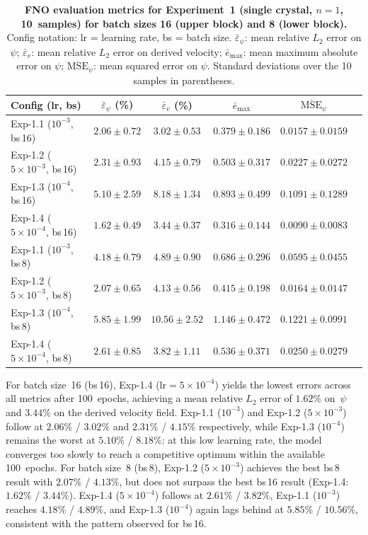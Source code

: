 \begin{table}[htbp]
\centering
\caption{\textbf{FNO evaluation metrics for Experiment~1 (single crystal, $n=1$, 10~samples)
         for batch sizes 16 (upper block) and 8 (lower block).}
         Config notation: lr = learning rate, bs = batch size.
         $\bar{\varepsilon}_\psi$: mean relative $L_2$ error on $\psi$;
         $\bar{\varepsilon}_v$: mean relative $L_2$ error on derived velocity;
         $\bar{e}_{\max}$: mean maximum absolute error on $\psi$;
         $\overline{\text{MSE}}_\psi$: mean squared error on $\psi$.
         Standard deviations over the 10 samples in parentheses.}
\label{tab:fno_metrics_exp1}
\begin{tabular}{lccccc}
\toprule
\textbf{Config (lr, bs)} & $\bar{\varepsilon}_\psi$ (\%) & $\bar{\varepsilon}_v$ (\%) & $\bar{e}_{\max}$ & $\overline{\text{MSE}}_\psi$ \\
\midrule
Exp-1.1 ($10^{-3}$, bs\,16)
    & $2.06 \pm 0.72$ & $3.02 \pm 0.53$ & $0.379 \pm 0.186$ & $0.0157 \pm 0.0159$ \\
Exp-1.2 ($5\times10^{-3}$, bs\,16)
    & $2.31 \pm 0.93$ & $4.15 \pm 0.79$ & $0.503 \pm 0.317$ & $0.0227 \pm 0.0272$ \\
Exp-1.3 ($10^{-4}$, bs\,16)
    & $5.10 \pm 2.59$ & $8.18 \pm 1.34$ & $0.893 \pm 0.499$ & $0.1091 \pm 0.1289$ \\
Exp-1.4 ($5\times10^{-4}$, bs\,16)
    & $1.62 \pm 0.49$ & $3.44 \pm 0.37$ & $0.316 \pm 0.144$ & $0.0090 \pm 0.0083$ \\
\midrule
Exp-1.1 ($10^{-3}$, bs\,8)
    & $4.18 \pm 0.79$ & $4.89 \pm 0.90$ & $0.686 \pm 0.296$ & $0.0595 \pm 0.0455$ \\
Exp-1.2 ($5\times10^{-3}$, bs\,8)
    & $2.07 \pm 0.65$ & $4.13 \pm 0.56$ & $0.415 \pm 0.198$ & $0.0164 \pm 0.0147$ \\
Exp-1.3 ($10^{-4}$, bs\,8)
    & $5.85 \pm 1.99$ & $10.56 \pm 2.52$ & $1.146 \pm 0.472$ & $0.1221 \pm 0.0991$ \\
Exp-1.4 ($5\times10^{-4}$, bs\,8)
    & $2.61 \pm 0.85$ & $3.82 \pm 1.11$ & $0.536 \pm 0.371$ & $0.0250 \pm 0.0279$ \\
\bottomrule
\end{tabular}
\end{table}

For batch size~16 (bs\,16), Exp-1.4 ($\mathrm{lr}=5\times10^{-4}$) yields the lowest errors across all metrics after 100~epochs, achieving a mean relative $L_2$ error of $1.62\%$ on~$\psi$ and $3.44\%$ on the derived velocity field.
Exp-1.1 ($10^{-3}$) and Exp-1.2 ($5\times10^{-3}$) follow at $2.06\%$ / $3.02\%$ and $2.31\%$ / $4.15\%$ respectively, while Exp-1.3 ($10^{-4}$) remains the worst at $5.10\%$ / $8.18\%$: at this low learning rate, the model converges too slowly to reach a competitive optimum within the available 100~epochs.
For batch size~8 (bs\,8), Exp-1.2 ($5\times10^{-3}$) achieves the best bs\,8 result with $2.07\%$ / $4.13\%$, but does not surpass the best bs\,16 result (Exp-1.4: $1.62\%$ / $3.44\%$). Exp-1.4 ($5\times10^{-4}$) follows at $2.61\%$ / $3.82\%$, Exp-1.1 ($10^{-3}$) reaches $4.18\%$ / $4.89\%$, and Exp-1.3 ($10^{-4}$) again lags behind at $5.85\%$ / $10.56\%$, consistent with the pattern observed for bs\,16.

